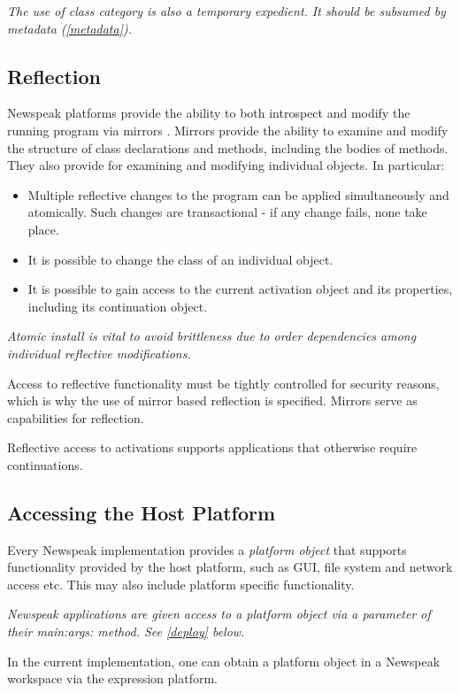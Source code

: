 \documentclass{article}
\newcommand{\code}[1]{{\sf #1}}
\begin{document}
{\it
The use of class category is also a temporary expedient. It should be subsumed by metadata (\ref{metadata}).
}

\subsection{Reflection}
\label{reflect}

Newspeak platforms provide the ability to both introspect and modify the running program via mirrors \cite{bracha-ungar04}.  Mirrors provide the ability to examine and modify the structure of class declarations and methods, including the bodies of methods. They also provide for examining and modifying individual objects. In particular: 
\begin{itemize}
\item Multiple reflective changes to the program can be applied simultaneously and atomically. Such changes are transactional - if any change fails, none take place.
\item It is possible to change the class of an individual object. 
\item It is possible to gain access to the current activation object and its properties, including its continuation object.
\end{itemize}


{\it
Atomic install is vital to avoid brittleness due to order dependencies among individual reflective modifications.

Access to reflective functionality must be tightly controlled for security reasons, which is why the use of mirror based reflection is specified. Mirrors serve as capabilities for reflection.

Reflective access to activations supports applications that otherwise require continuations.
}

\subsection{Accessing the Host Platform}
\label{platform}

Every Newspeak implementation provides a {\em platform object} that supports functionality
provided by the host platform, such as GUI, file system and network access etc. This may also include platform specific functionality. 

{\it Newspeak applications are given access to a platform object via a parameter of their \code{main:args:} method. See \ref{deploy} below.

In the current implementation, one can obtain a platform object in a Newspeak workspace via the expression \code{platform}. 
}
\end{document}
